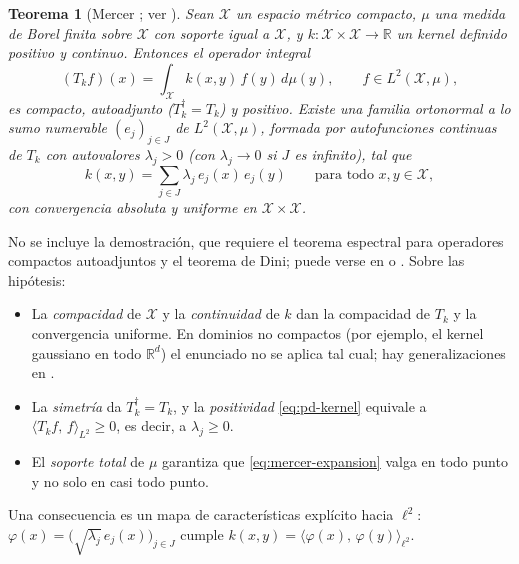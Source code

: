 \documentclass[11pt,a4paper]{article}
\newcommand{\R}{\mathbb{R}}
\newcommand{\X}{\mathcal{X}}
\newcommand{\dg}{\dagger}                         %
\newcommand{\inner}[2]{\langle #1,\, #2\rangle}
\theoremstyle{plain}
\newtheorem{teorema}{Teorema}[section]
\theoremstyle{definition}
\theoremstyle{remark}
\numberwithin{equation}{section}
\begin{document}
\begin{teorema}[Mercer \cite{mercer1909}; ver {\cite[teorema 4.49]{steinwart2008}}]
\label{teo:mercer}
Sean $\X$ un espacio métrico compacto, $\mu$ una medida de Borel finita sobre $\X$ con
soporte igual a $\X$, y $k\colon\X\times\X\to\R$ un kernel definido positivo y continuo.
Entonces el operador integral
\begin{equation}\label{eq:mercer-operator}
  (T_kf)(x)=\int_{\X}k(x,y)\,f(y)\,d\mu(y),\qquad f\in L^2(\X,\mu),
\end{equation}
es compacto, autoadjunto ($T_k^{\dg}=T_k$) y positivo. Existe una familia ortonormal a lo
sumo numerable $(e_j)_{j\in J}$ de $L^2(\X,\mu)$, formada por autofunciones continuas de
$T_k$ con autovalores $\lambda_j>0$ (con $\lambda_j\to0$ si $J$ es infinito), tal que
\begin{equation}\label{eq:mercer-expansion}
  k(x,y)=\sum_{j\in J}\lambda_j\,e_j(x)\,e_j(y)\qquad\text{para todo }x,y\in\X,
\end{equation}
con convergencia absoluta y uniforme en $\X\times\X$.
\end{teorema}

No se incluye la demostración, que requiere el teorema espectral para operadores compactos
autoadjuntos y el teorema de Dini; puede verse en
\cite[sección 4.5]{steinwart2008} o \cite{cuckersmale2002}. Sobre las hipótesis:
\begin{itemize}
  \item La \emph{compacidad} de $\X$ y la \emph{continuidad} de $k$ dan la compacidad de
        $T_k$ y la convergencia uniforme. En dominios no compactos (por ejemplo, el kernel
        gaussiano en todo $\R^d$) el enunciado no se aplica tal cual; hay generalizaciones
        en \cite{steinwartscovel2012}.
  \item La \emph{simetría} da $T_k^{\dg}=T_k$, y la \emph{positividad}
        \eqref{eq:pd-kernel} equivale a $\inner{T_kf}{f}_{L^2}\ge0$, es decir, a
        $\lambda_j\ge0$.
  \item El \emph{soporte total} de $\mu$ garantiza que \eqref{eq:mercer-expansion} valga en
        todo punto y no solo en casi todo punto.
\end{itemize}
Una consecuencia es un mapa de características explícito hacia $\ell^2$:
$\varphi(x)=\bigl(\sqrt{\lambda_j}\,e_j(x)\bigr)_{j\in J}$ cumple
$k(x,y)=\inner{\varphi(x)}{\varphi(y)}_{\ell^2}$.
\end{document}
